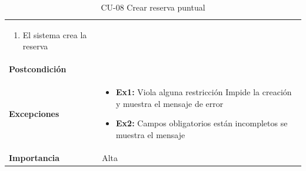\begin{table}[p]
\begin{tabularx}{\linewidth}{ p{} p{} }
\begin{enumerate}
			\item El sistema crea la reserva
		\end{enumerate}\\
		\textbf{Postcondición} &  \\
		\textbf{Excepciones}          & 
		\begin{itemize}
			\tightlist
			\item \textbf{Ex1:} Viola alguna restricción \textrightarrow{} Impide la creación y muestra el mensaje de error
			\item \textbf{Ex2:} Campos obligatorios están incompletos \textrightarrow{} se muestra el mensaje
		\end{itemize} \\
		\textbf{Importancia}          & Alta \\
		\bottomrule
	\end{tabularx}
	\caption{CU-08 Crear reserva puntual}
\end{table}

